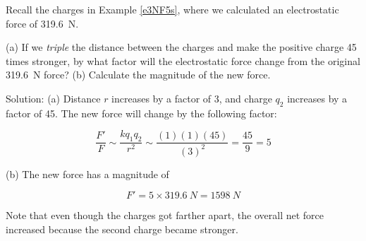 \documentclass[dvipsnames]{article}
\begin{document}
\begin{example}
Recall the charges in Example \ref{e3NF5s}, where we calculated an electrostatic force of \SI{319.6}{N}.
\vspace{-1em}

\begin{center}
\end{center}

(a) If we \textit{triple} the distance between the charges and make the positive charge 45 times stronger, by what factor will the electrostatic force change from the original \SI{319.6}{N} force? (b) Calculate the magnitude of the new force.
\end{example}

Solution: (a) Distance $r$ increases by a factor of 3, and charge $q_2$ increases by a factor of 45. The new force will change by the following factor:

\begin{equation*}
    \frac{F'}{F} \sim \frac{k q_1 q_2}{r^2} \sim \frac{(1)(1)(45)}{(3)^2} = \frac{45}{9} = 5
\end{equation*}

(b) The new force has a magnitude of 

\begin{equation*}
    F' = 5 \times \SI{319.6}{N} = \SI{1598}{N}
\end{equation*}

Note that even though the charges got farther apart, the overall net force increased because the second charge became stronger.
\end{document}
